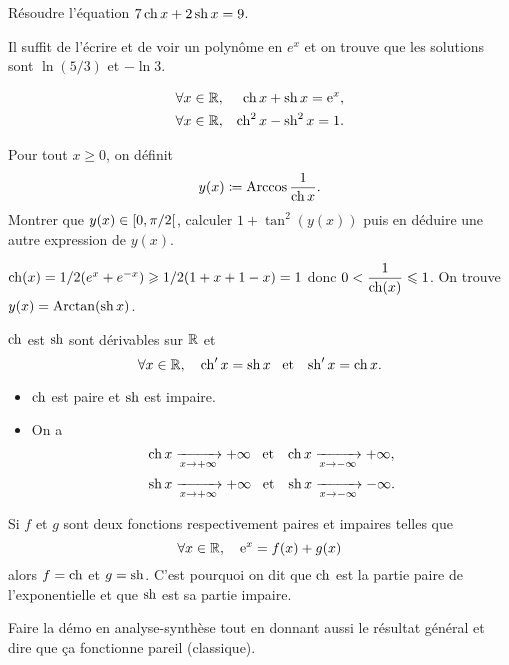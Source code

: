 \documentclass{magnolia}
\begin{document}
\begin{exoUnique}
\exo Résoudre l'équation $7\operatorname{ch} x+2\operatorname{sh} x=9$.
  \begin{sol}
  Il suffit de l'écrire et de voir un polynôme en $e^x$ et on trouve que les solutions sont $\ln(5/3)$ et $-\ln 3$.
  \end{sol}
\end{exoUnique}

\begin{proposition}[utile=-3]
\begin{eqnarray*}
\forall x\in\mathbb{R}, & & \operatorname{ch} x+\operatorname{sh} x={\rm e}^x,\\
\forall x\in\mathbb{R}, & & \operatorname{ch}^2 x-\operatorname{sh}^2 x=1.  
\end{eqnarray*}
\end{proposition}

\begin{exoUnique}
\exemple Pour tout $x\geq 0$, on définit
  \[y(x)\coloneqq\operatorname{Arccos}\frac{1}{\operatorname{ch} x}.\]
  Montrer que $y(x)\in\left[0,\pi/2\right[$, calculer $1+\tan^2(y(x))$ puis en
  déduire une autre expression de $y(x)$.
  \begin{sol}
  $\operatorname{ch}(x)=1/2(e^x+e^{-x})\geqslant 1/2(1+x+1-x)=1$ donc $0<\dfrac{1}{\operatorname{ch}(x)}\leqslant 1$.
  On trouve $y(x)=\operatorname{Arctan}(\operatorname{sh} x)$.
  \end{sol}
\end{exoUnique}

\begin{proposition}[utile=-3]
$\operatorname{ch}$ est $\operatorname{sh}$ sont dérivables sur $\mathbb{R}$ et
\[\forall x\in\mathbb{R} ,\quad \operatorname{ch}'x=\operatorname{sh} x \quad\!\text{et}\quad\! \operatorname{sh}'x=\operatorname{ch} x.\]
\end{proposition}

\begin{proposition}[utile=-3]
\begin{itemize}
\item $\operatorname{ch}$ est paire et $\operatorname{sh}$ est impaire.
\item On a
  \[\operatorname{ch} x \xrightarrow[x\rightarrow +\infty]{} +\infty \quad\!\text{et}\quad\!
    \operatorname{ch} x \xrightarrow[x\rightarrow -\infty]{} +\infty,\]
  \[\operatorname{sh} x \xrightarrow[x\rightarrow +\infty]{} +\infty \quad\!\text{et}\quad\!
    \operatorname{sh} x \xrightarrow[x\rightarrow -\infty]{} -\infty.\]
\end{itemize}
\end{proposition}

\begin{remarqueUnique}
\remarque Si $f$ et $g$ sont deux fonctions respectivement paires et impaires
  telles que
  \[\forall x\in\mathbb{R} ,\quad {\rm e}^x=f(x)+g(x)\]
  alors $f=\operatorname{ch}$ et $g=\operatorname{sh}$. C'est pourquoi on dit que $\operatorname{ch}$ est la
  partie paire de l'exponentielle et que $\operatorname{sh}$ est sa partie impaire.
\end{remarqueUnique}
\begin{sol}
Faire la démo en analyse-synthèse tout en donnant aussi le résultat général et dire que ça fonctionne pareil (classique).
\end{sol}
\end{document}
